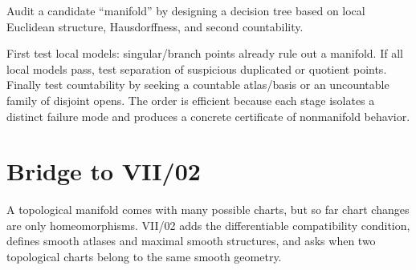 \begin{problem}[Challenge]\label{chal:vii01-05}
Audit a candidate ``manifold'' by designing a decision tree based on local Euclidean structure, Hausdorffness, and second countability.
\end{problem}
\begin{solution}
First test local models: singular/branch points already rule out a manifold.  If all local models pass, test separation of suspicious duplicated or quotient points.  Finally test countability by seeking a countable atlas/basis or an uncountable family of disjoint opens.  The order is efficient because each stage isolates a distinct failure mode and produces a concrete certificate of nonmanifold behavior.
\end{solution}

\section*{Bridge to VII/02}
A topological manifold comes with many possible charts, but so far chart changes are only homeomorphisms.  VII/02 adds the differentiable compatibility condition, defines smooth atlases and maximal smooth structures, and asks when two topological charts belong to the same smooth geometry.

